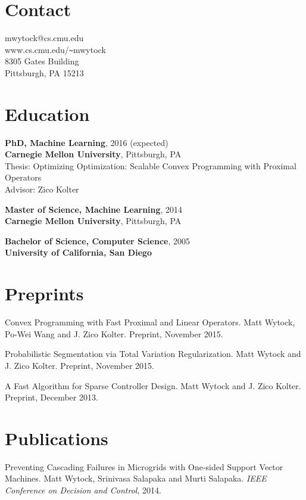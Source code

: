 \documentclass[margin, line]{res}
\begin{document}
\renewcommand{\namefont}{\Huge\bf}


\begin{resume}
\section{Contact}
mwytock@cs.cmu.edu \\
www.cs.cmu.edu/\verb+~+mwytock \\
8305 Gates Building \\
Pittsburgh, PA 15213

\section{Education}

{\bf PhD, Machine Learning}, 2016 (expected) \\
{\bf Carnegie Mellon University}, Pittsburgh, PA \\
Thesis: Optimizing Optimization: Scalable Convex Programming with Proximal Operators \\
Advisor: Zico Kolter

{\bf Master of Science, Machine Learning}, 2014 \\
{\bf Carnegie Mellon University}, Pittsburgh, PA

{\bf Bachelor of Science, Computer Science}, 2005 \\
{\bf University of California, San Diego}

\section{Preprints}

Convex Programming with Fast Proximal and Linear Operators. Matt Wytock, Po-Wei
Wang and J. Zico Kolter. Preprint, November 2015.

Probabilistic Segmentation via Total Variation Regularization. Matt Wytock and
J. Zico Kolter. Preprint, November 2015.

A Fast Algorithm for Sparse Controller Design. Matt Wytock and J. Zico
Kolter. Preprint, December 2013.

\section{Publications}

Preventing Cascading Failures in Microgrids with One-sided Support Vector
Machines. Matt Wytock, Srinivasa Salapaka and Murti Salapaka. \emph{IEEE
Conference on Decision and Control}, 2014.


\end{resume}
\end{document}
